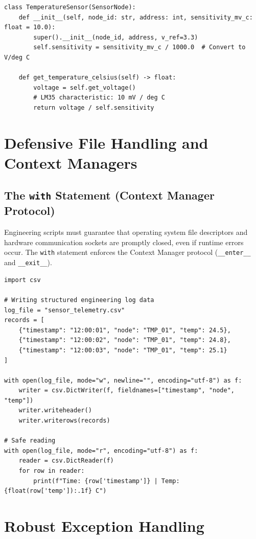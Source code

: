\begin{lstlisting}[caption={Specialized Temperature Sensor Subclass}]
class TemperatureSensor(SensorNode):
    def __init__(self, node_id: str, address: int, sensitivity_mv_c: float = 10.0):
        super().__init__(node_id, address, v_ref=3.3)
        self.sensitivity = sensitivity_mv_c / 1000.0  # Convert to V/deg C
        
    def get_temperature_celsius(self) -> float:
        voltage = self.get_voltage()
        # LM35 characteristic: 10 mV / deg C
        return voltage / self.sensitivity
\end{lstlisting}

\section{Defensive File Handling and Context Managers}

\subsection{The \texttt{with} Statement (Context Manager Protocol)}
Engineering scripts must guarantee that operating system file descriptors and hardware communication sockets are promptly closed, even if runtime errors occur. The \texttt{with} statement enforces the Context Manager protocol (\texttt{\_\_enter\_\_} and \texttt{\_\_exit\_\_}).

\begin{lstlisting}[caption={Reading and Writing Telemetry Logs with CSV}]
import csv

# Writing structured engineering log data
log_file = "sensor_telemetry.csv"
records = [
    {"timestamp": "12:00:01", "node": "TMP_01", "temp": 24.5},
    {"timestamp": "12:00:02", "node": "TMP_01", "temp": 24.8},
    {"timestamp": "12:00:03", "node": "TMP_01", "temp": 25.1}
]

with open(log_file, mode="w", newline="", encoding="utf-8") as f:
    writer = csv.DictWriter(f, fieldnames=["timestamp", "node", "temp"])
    writer.writeheader()
    writer.writerows(records)

# Safe reading
with open(log_file, mode="r", encoding="utf-8") as f:
    reader = csv.DictReader(f)
    for row in reader:
        print(f"Time: {row['timestamp']} | Temp: {float(row['temp']):.1f} C")
\end{lstlisting}

\section{Robust Exception Handling}

